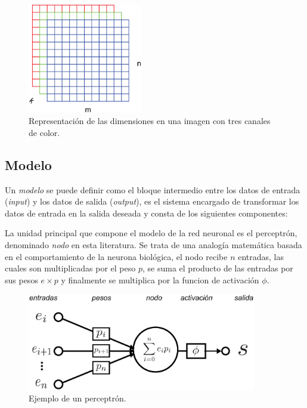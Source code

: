 \begin{figure}[h!]
    \includegraphics[width=50mm]{Figuras/rgb_matrix_2.eps}
    \centering
    \caption{Representación de las dimensiones en una imagen con tres canales de color.}
    \label{fig:rgb_mat}
\end{figure}


\subsection{Modelo}
Un \emph{modelo} se puede definir como el bloque intermedio entre los datos de entrada (\emph{input}) y los datos de salida (\emph{output}), es el sistema encargado de transformar los datos de entrada en la salida deseada y consta de los siguientes componentes:

La unidad principal que compone el modelo de la red neuronal es el perceptrón, denominado \emph{nodo} en esta literatura. Se trata de una analogía matemática basada en el comportamiento de la neurona biológica, el nodo recibe $n$ entradas, las cuales son multiplicadas por el peso $p$, se suma el producto de las entradas por sus pesos $ e \times p$ y finalmente se multiplica por la funcion de activación $\phi$. 

\begin{figure}[h!]
    \includegraphics[width=100mm]{Figuras/neural_network.eps}
    \centering
    \caption{Ejemplo de un perceptrón.}
    \label{fig:percep}
\end{figure}

